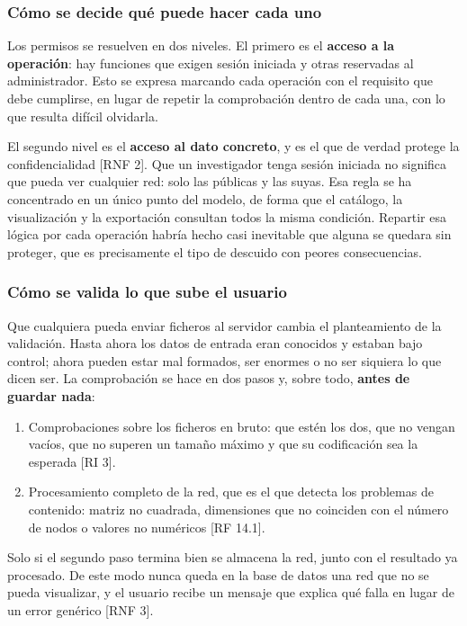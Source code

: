 \subsubsection*{Cómo se decide qué puede hacer cada uno}

Los permisos se resuelven en dos niveles. El primero es el \textbf{acceso a la operación}: hay
funciones que exigen sesión iniciada y otras reservadas al administrador. Esto se expresa marcando
cada operación con el requisito que debe cumplirse, en lugar de repetir la comprobación dentro de
cada una, con lo que resulta difícil olvidarla.

El segundo nivel es el \textbf{acceso al dato concreto}, y es el que de verdad protege la
confidencialidad [RNF 2]. Que un investigador tenga sesión iniciada no significa que pueda ver
cualquier red: solo las públicas y las suyas. Esa regla se ha concentrado en un único punto del
modelo, de forma que el catálogo, la visualización y la exportación consultan todos la misma
condición. Repartir esa lógica por cada operación habría hecho casi inevitable que alguna se quedara
sin proteger, que es precisamente el tipo de descuido con peores consecuencias.

\subsubsection*{Cómo se valida lo que sube el usuario}

Que cualquiera pueda enviar ficheros al servidor cambia el planteamiento de la validación. Hasta
ahora los datos de entrada eran conocidos y estaban bajo control; ahora pueden estar mal formados,
ser enormes o no ser siquiera lo que dicen ser. La comprobación se hace en dos pasos y, sobre todo,
\textbf{antes de guardar nada}:

\begin{enumerate}
	\item Comprobaciones sobre los ficheros en bruto: que estén los dos, que no vengan vacíos, que no
		superen un tamaño máximo y que su codificación sea la esperada [RI 3].
	\item Procesamiento completo de la red, que es el que detecta los problemas de contenido: matriz
		no cuadrada, dimensiones que no coinciden con el número de nodos o valores no numéricos
		[RF 14.1].
\end{enumerate}

Solo si el segundo paso termina bien se almacena la red, junto con el resultado ya procesado. De
este modo nunca queda en la base de datos una red que no se pueda visualizar, y el usuario recibe un
mensaje que explica qué falla en lugar de un error genérico [RNF 3].

